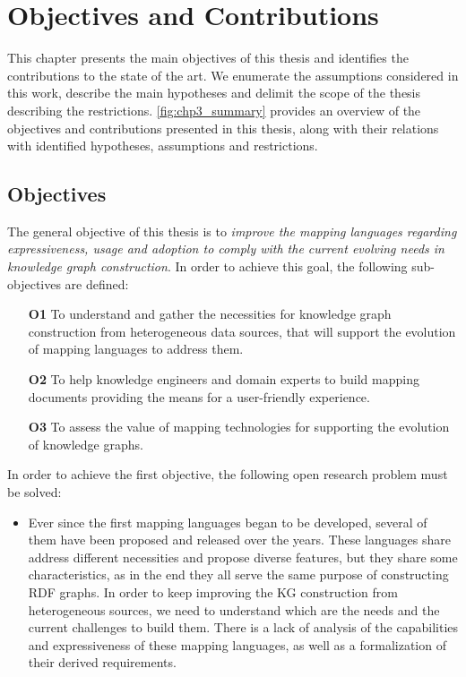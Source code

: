 \chapter{Objectives and Contributions}
\label{chapter:objectives}

This chapter presents the main objectives of this thesis and identifies the contributions to the state of the art. We enumerate the assumptions considered in this work, describe the main hypotheses and delimit the scope of the thesis describing the restrictions. \cref{fig:chp3_summary} provides an overview of the objectives and contributions presented in this thesis, along with their relations with identified hypotheses, assumptions and restrictions. 

\section{Objectives}
\label{sec:chp3-objectives}

The general objective of this thesis is to \textit{improve the mapping languages regarding expressiveness, usage and adoption to comply with the current evolving needs in knowledge graph construction}. In order to achieve this goal, the following sub-objectives are defined:

\begin{enumerate}
    \item[\textbf{O1}] To understand and gather the necessities for knowledge graph construction from heterogeneous data sources, that will support the evolution of mapping languages to address them. 
    \item[\textbf{O2}] To help knowledge engineers and domain experts to build mapping documents providing the means for a user-friendly experience.
    \item[\textbf{O3}] To assess the value of mapping technologies for supporting the evolution of knowledge graphs. 
\end{enumerate}

In order to achieve the first objective, the following open research problem must be solved:
\begin{itemize}
    \item Ever since the first mapping languages began to be developed, several of them have been proposed and released over the years. These languages share address different necessities and propose diverse features, but they share some characteristics, as in the end they all serve the same purpose of constructing RDF graphs. In order to keep improving the KG construction from heterogeneous sources, we need to understand which are the needs and the current challenges to build them. There is a lack of analysis of the capabilities and expressiveness of these mapping languages, as well as a formalization of their derived requirements. 
\end{itemize}

